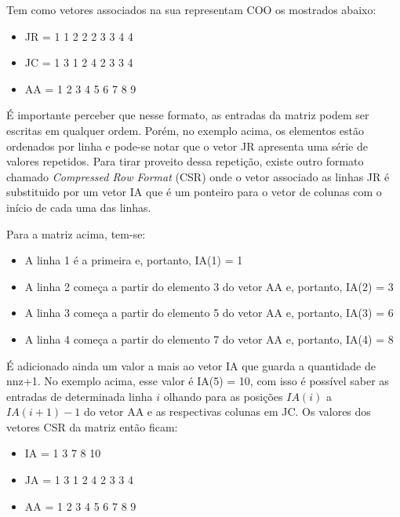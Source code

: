 Tem como vetores associados na sua representam COO os mostrados abaixo:


\begin{center}
    \begin{itemize}
        \item  JR = 1 1 2 2 2 3 3 4 4
        \item  JC = 1 3 1 2 4 2 3 3 4
        \item  AA = 1 2 3 4 5 6 7 8 9
    \end{itemize}
\end{center}


É importante perceber que nesse formato, as entradas da matriz podem ser escritas em qualquer ordem. Porém, no exemplo acima, os elementos estão ordenados por linha e pode-se notar que o vetor JR apresenta uma série de valores repetidos. Para tirar proveito dessa repetição, existe outro formato chamado \textit{Compressed Row Format} (CSR) onde o vetor associado as linhas JR é substituido por um vetor IA que é um ponteiro para o vetor de colunas com o início de cada uma das linhas.

Para a matriz acima, tem-se:

\begin{itemize}
    \item A linha 1 é a primeira e, portanto, IA(1) = 1
    \item A linha 2 começa a partir do elemento 3 do vetor AA e, portanto, IA(2) = 3
    \item A linha 3 começa a partir do elemento 5 do vetor AA e, portanto, IA(3) = 6
    \item A linha 4 começa a partir do elemento 7 do vetor AA e, portanto, IA(4) = 8
\end{itemize}

É adicionado ainda um valor a mais ao vetor IA que guarda a quantidade de nnz+1. No exemplo acima, esse valor é  IA(5) = 10, com isso é possível saber as entradas de determinada linha $i$ olhando para as posições $IA(i)$ a $IA(i+1)-1$ do vetor AA e as respectivas colunas em JC. Os valores dos vetores CSR da matriz então ficam:

\begin{center}
    \begin{itemize}
        \item IA = 1 3 7 8 10
        \item JA = 1 3 1 2 4 2 3 3 4
        \item AA = 1 2 3 4 5 6 7 8 9
    \end{itemize}
\end{center}


